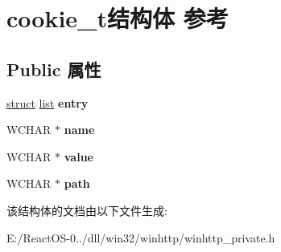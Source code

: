 \hypertarget{structcookie__t}{}\section{cookie\+\_\+t结构体 参考}
\label{structcookie__t}
\subsection*{Public 属性}
\begin{DoxyCompactItemize}
\item 
\mbox{\label{structcookie__t_aac89fb227294b7820ef934c939bc2c82}} 
\hyperlink{interfacestruct}{struct} \hyperlink{classlist}{list} {\bfseries entry}
\item 
\mbox{\label{structcookie__t_a8a286e8f114524b14e337bbc1cf9df54}} 
W\+C\+H\+AR $\ast$ {\bfseries name}
\item 
\mbox{\label{structcookie__t_a98a09724ac259edbff3b89e248d0d15b}} 
W\+C\+H\+AR $\ast$ {\bfseries value}
\item 
\mbox{\label{structcookie__t_a75ab5aca89d6327a38b0e7655651e49a}} 
W\+C\+H\+AR $\ast$ {\bfseries path}
\end{DoxyCompactItemize}


该结构体的文档由以下文件生成\+:\begin{DoxyCompactItemize}
\item 
E\+:/\+React\+O\+S-\/0../dll/win32/winhttp/winhttp\+\_\+private.\+h\end{DoxyCompactItemize}
